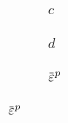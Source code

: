 \begin{frame}
\begin{columns}[T]
\begin{column}{0.6\textwidth}
\begin{figure}
{          \vspace{-1em}
          
          \begin{subfigure}{0.15\textwidth}
            \caption*{}
          \end{subfigure}
          \begin{subfigure}{0.19\textwidth}
            \centering
            \caption*{$c$}
          \end{subfigure}
          \hspace{0.06\textwidth}
          \begin{subfigure}{0.19\textwidth}
            \centering
            \caption*{$d$}
          \end{subfigure}
          \hspace{0.06\textwidth}
          \begin{subfigure}{0.19\textwidth}
            \centering
            \caption*{$\ep$}
          \end{subfigure}
          
          \vspace{-1em}
          
}
\end{figure}
\end{column}
\end{columns}
\end{frame}
